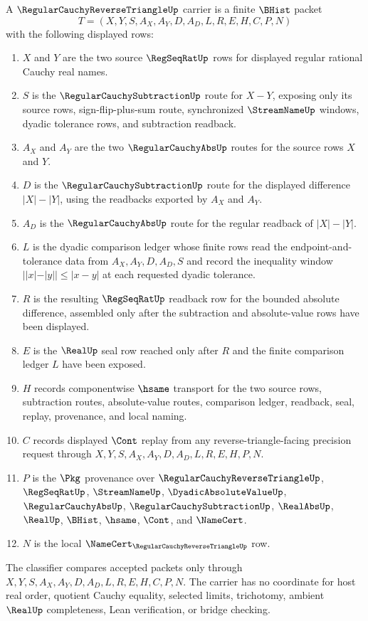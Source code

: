 \begin{definition}
\label{def:regular-cauchy-reverse-triangle-carrier}
A $\RegularCauchyReverseTriangleUp$ carrier is a finite $\BHist$ packet
$$
T=(X,Y,S,A_X,A_Y,D,A_D,L,R,E,H,C,P,N)
$$
with the following displayed rows:
\begin{enumerate}
\item $X$ and $Y$ are the two source $\RegSeqRatUp$ rows for displayed regular rational Cauchy real names.
\item $S$ is the $\RegularCauchySubtractionUp$ route for $X-Y$, exposing only its source rows, sign-flip-plus-sum route, synchronized $\StreamNameUp$ windows, dyadic tolerance rows, and subtraction readback.
\item $A_X$ and $A_Y$ are the two $\RegularCauchyAbsUp$ routes for the source rows $X$ and $Y$.
\item $D$ is the $\RegularCauchySubtractionUp$ route for the displayed difference $|X|-|Y|$, using the readbacks exported by $A_X$ and $A_Y$.
\item $A_D$ is the $\RegularCauchyAbsUp$ route for the regular readback of $|X|-|Y|$.
\item $L$ is the dyadic comparison ledger whose finite rows read the endpoint-and-tolerance data from $A_X,A_Y,D,A_D,S$ and record the inequality window $||x|-|y|| \leq |x-y|$ at each requested dyadic tolerance.
\item $R$ is the resulting $\RegSeqRatUp$ readback row for the bounded absolute difference, assembled only after the subtraction and absolute-value rows have been displayed.
\item $E$ is the $\RealUp$ seal row reached only after $R$ and the finite comparison ledger $L$ have been exposed.
\item $H$ records componentwise $\hsame$ transport for the two source rows, subtraction routes, absolute-value routes, comparison ledger, readback, seal, replay, provenance, and local naming.
\item $C$ records displayed $\Cont$ replay from any reverse-triangle-facing precision request through $X,Y,S,A_X,A_Y,D,A_D,L,R,E,H,P,N$.
\item $P$ is the $\Pkg$ provenance over $\RegularCauchyReverseTriangleUp$, $\RegSeqRatUp$, $\StreamNameUp$, $\DyadicAbsoluteValueUp$, $\RegularCauchyAbsUp$, $\RegularCauchySubtractionUp$, $\RealAbsUp$, $\RealUp$, $\BHist$, $\hsame$, $\Cont$, and $\NameCert$.
\item $N$ is the local $\NameCert_{\RegularCauchyReverseTriangleUp}$ row.
\end{enumerate}
The classifier compares accepted packets only through $X,Y,S,A_X,A_Y,D,A_D,L,R,E,H,C,P,N$. The carrier has no coordinate for host real order, quotient Cauchy equality, selected limits, trichotomy, ambient $\RealUp$ completeness, Lean verification, or bridge checking.
\end{definition}

